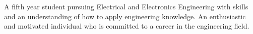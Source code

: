 \documentclass[10pt]{article}
\begin{document}
%
\begin{center}
\begin{minipage}{0.92\textwidth}
	\raggedright
		\normalsize{A fifth year student pursuing Electrical and Electronics Engineering with skills and an understanding of how to apply engineering knowledge. An enthusiastic and motivated individual who is committed to a career in the engineering field.}
\end{minipage}
\end{center}

\end{document}
